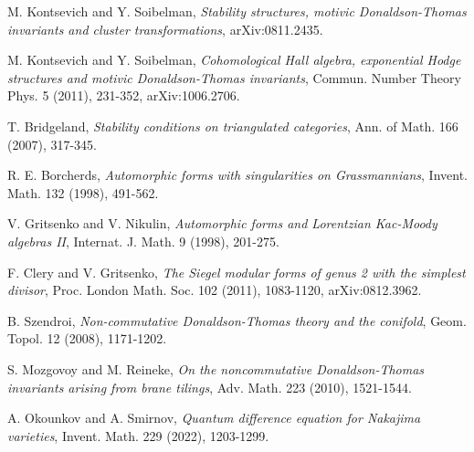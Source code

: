 \documentclass[11pt]{article}
\theoremstyle{definition}
\begin{document}
\begin{enumerate}[label={[\arabic*]}, leftmargin=1.4em]
\item M. Kontsevich and Y. Soibelman,
  \emph{Stability structures, motivic Donaldson-Thomas invariants and
  cluster transformations}, arXiv:0811.2435.
\item M. Kontsevich and Y. Soibelman,
  \emph{Cohomological Hall algebra, exponential Hodge structures and
  motivic Donaldson-Thomas invariants}, Commun. Number Theory Phys. 5
  (2011), 231-352, arXiv:1006.2706.
\item T. Bridgeland,
  \emph{Stability conditions on triangulated categories},
  Ann. of Math. 166 (2007), 317-345.
\item R. E. Borcherds,
  \emph{Automorphic forms with singularities on Grassmannians},
  Invent. Math. 132 (1998), 491-562.
\item V. Gritsenko and V. Nikulin,
  \emph{Automorphic forms and Lorentzian Kac-Moody algebras II},
  Internat. J. Math. 9 (1998), 201-275.
\item F. Clery and V. Gritsenko,
  \emph{The Siegel modular forms of genus 2 with the simplest divisor},
  Proc. London Math. Soc. 102 (2011), 1083-1120, arXiv:0812.3962.
\item B. Szendroi,
  \emph{Non-commutative Donaldson-Thomas theory and the conifold},
  Geom. Topol. 12 (2008), 1171-1202.
\item S. Mozgovoy and M. Reineke,
  \emph{On the noncommutative Donaldson-Thomas invariants arising from
  brane tilings}, Adv. Math. 223 (2010), 1521-1544.
\item A. Okounkov and A. Smirnov,
  \emph{Quantum difference equation for Nakajima varieties},
  Invent. Math. 229 (2022), 1203-1299.
\end{enumerate}
\end{document}
